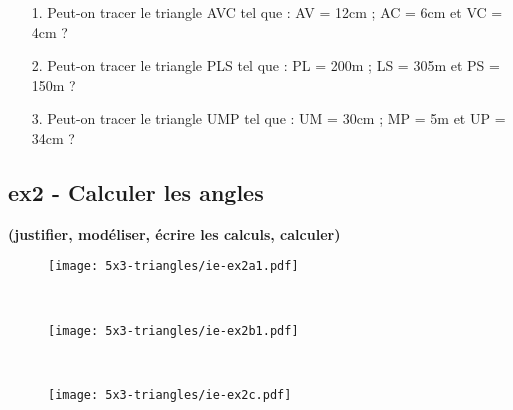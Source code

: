 \begin{enumerate}
  \item[1.] Peut-on tracer le triangle AVC tel que : AV = 12cm ; AC = 6cm et VC = 4cm ? 
  \item[2.] Peut-on tracer le triangle PLS tel que : PL = 200m ; LS = 305m et PS = 150m ? 
  \item[3.] Peut-on tracer le triangle UMP tel que : UM = 30cm ; MP = 5m et UP = 34cm ?  
\end{enumerate} 

\Pointilles[14] 


\newpage

\subsection*{ex2 - Calculer les angles}
\textbf{(justifier, modéliser, écrire les calculs, calculer)}

\begin{minipage}[t]{0.4\textwidth}
  \begin{figure}[H]
    \centering
    \texttt{[image: 5x3-triangles/ie-ex2a1.pdf]}
  \end{figure}

\end{minipage}
\begin{minipage}[t]{0.6\textwidth}

  \Pointilles[8] \\
\end{minipage}

\begin{minipage}[t]{0.4\textwidth}
  \begin{figure}[H]
    \centering
    \texttt{[image: 5x3-triangles/ie-ex2b1.pdf]}
  \end{figure} 

\end{minipage}
\begin{minipage}[t]{0.6\textwidth}

  \Pointilles[8] \\
\end{minipage}

\begin{minipage}[t]{0.4\textwidth}
\begin{figure}[H]
    \centering
    \texttt{[image: 5x3-triangles/ie-ex2c.pdf]}
  \end{figure} 

\end{minipage}
\begin{minipage}[t]{0.6\textwidth}

  \Pointilles[8]
\end{minipage}



